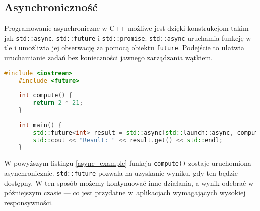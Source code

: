\subsection{Asynchroniczność}
Programowanie asynchroniczne w C++ możliwe jest dzięki konstrukcjom takim jak \texttt{std::async}, \texttt{std::future} i \texttt{std::promise}. \texttt{std::async} uruchamia funkcję w tle i umożliwia jej obserwację za pomocą obiektu \texttt{future}. Podejście to ułatwia uruchamianie zadań bez konieczności jawnego zarządzania wątkiem.

\begin{lstlisting}[language=C++, style=VS2017,  caption={Przykład użycia std::async}, label={async_example}]
    #include <iostream>
    #include <future>
    
    int compute() {
        return 2 * 21;
    }
    
    int main() {
        std::future<int> result = std::async(std::launch::async, compute);
        std::cout << "Result: " << result.get() << std::endl;
    }
\end{lstlisting}
W powyższym listingu \ref{async_example} funkcja \texttt{compute()} zostaje uruchomiona asynchronicznie. \texttt{std::future} pozwala na uzyskanie wyniku, gdy ten będzie dostępny. W ten sposób możemy kontynuować inne działania, a wynik odebrać w późniejszym czasie — co jest przydatne w~aplikacjach wymagających wysokiej responsywności.


